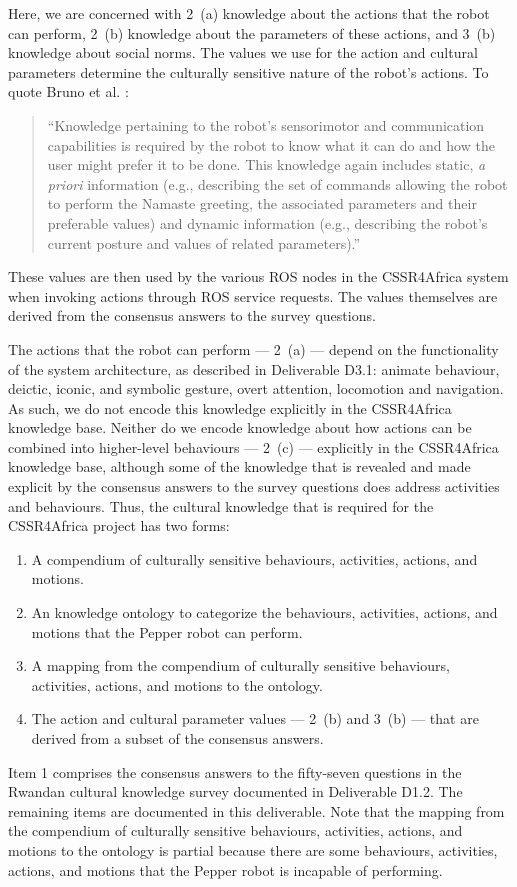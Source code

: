 \documentclass{CSSRforAfrica}
\begin{document}
Here, we are concerned with  2~(a) knowledge about the actions that the robot can perform, 2~(b) knowledge about the parameters of these actions, and  3~(b) knowledge about social norms. The values we use for the action and cultural parameters determine the culturally sensitive nature of the robot's actions. To quote Bruno et al. \cite{Brunoetal2019}:
\begin{quotation}
``Knowledge pertaining to the robot’s sensorimotor and communication capabilities is required by the robot to know what it can do and how the user might prefer it to be done. This knowledge again includes static, {\em a priori} information (e.g., describing the set of commands allowing the robot to perform the Namaste greeting, the associated parameters and their preferable values) and dynamic information (e.g., describing the robot’s current posture and values of related parameters).''
\end{quotation}
These values are then used by the various ROS nodes in the CSSR4Africa system when invoking actions through ROS service requests.  The values themselves are derived from the consensus answers to the survey questions. 

The actions that the robot can perform --- 2~(a) --- depend on the functionality of the system architecture, as described in Deliverable D3.1: animate behaviour, deictic, iconic, and symbolic gesture, overt attention, locomotion and navigation. As such, we do not encode this knowledge explicitly in the CSSR4Africa knowledge base.  Neither do we encode  knowledge about how actions can be combined into higher-level behaviours --- 2~(c) --- explicitly in the CSSR4Africa knowledge base, although some of the knowledge that is revealed and made explicit by the consensus answers to the survey questions does address activities and behaviours.  Thus, the cultural knowledge that is required for the CSSR4Africa project has two forms:
\begin{enumerate}
\item A compendium of culturally sensitive behaviours, activities, actions, and motions.
\item An knowledge ontology to categorize the behaviours, activities, actions, and motions that the Pepper robot can perform.
\item A mapping from the compendium of culturally sensitive behaviours, activities, actions, and motions to the ontology.
\item The action and cultural parameter values  --- 2~(b) and 3~(b) --- that are derived from a subset of the consensus answers.
\end{enumerate}
Item 1 comprises the consensus answers to the fifty-seven questions in the Rwandan cultural knowledge survey documented in Deliverable D1.2. The remaining items are documented in this deliverable.
Note that the mapping from the compendium of culturally sensitive behaviours, activities, actions, and motions to the ontology is partial because there are some behaviours, activities, actions, and motions that the Pepper robot is incapable of performing.
\end{document}
